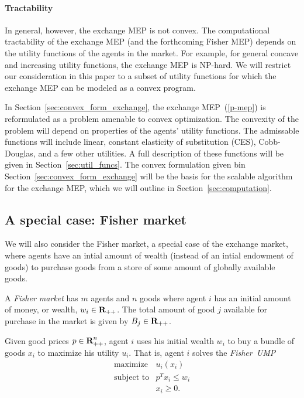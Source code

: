 \documentclass[12pt]{article}
\begin{document}
\paragraph{Tractability}
In general, however, the exchange MEP is not convex.
The computational tractability of the exchange MEP
(and the forthcoming Fisher MEP) depends on the utility functions of
the agents in the market.
For example, for general concave and increasing utility functions,
the exchange MEP is NP-hard. %
We will restrict our consideration in this paper to a subset of utility
functions for which the exchange MEP can be modeled as a convex program.

In Section~\ref{sec:convex_form_exchange}, the exchange MEP~(\ref{p-mep})
is reformulated as a problem amenable to convex optimization.
The convexity of the problem will depend on properties of the
agents' utility functions.
The admissable functions will include linear, constant elasticity
of substitution (CES), Cobb-Douglas, and a few other utilities.
A full description of these functions will be given in Section~\ref{sec:util_funcs}.
The convex formulation given bin Section~\ref{sec:convex_form_exchange} will
be the basis for the scalable algorithm for the exchange MEP, which
we will outline in Section~\ref{sec:computation}.



\subsection{A special case: Fisher market}

We will also consider the Fisher market, a special case of the exchange market, where agents have an intial amount of wealth (instead of an intial endowment of goods)
to purchase goods from a store of some amount of globally available goods.


A \emph{Fisher market} has $m$ agents and $n$ goods where
agent $i$ has an initial amount of money, or wealth, $w_i \in {\mbox{\bf R}}_{++}$.
The total amount of good $j$ available for purchase in the market is given by
$B_j \in {\mbox{\bf R}}_{++}$.

Given good prices $p \in {\mbox{\bf R}}^n_{++}$, agent $i$ uses his initial
wealth $w_i$ to buy a bundle of goods $x_i$ to maximize his utility $u_i$.
That is, agent $i$ solves the \emph{Fisher~UMP}
\begin{equation}
\label{p-fisher-ump}
\begin{array}{ll}
\mbox{maximize} & u_i(x_i) \\
\mbox{subject to} & p^T x_i \leq w_i \\
& x_i \geq 0.
\end{array}
\end{equation}
\end{document}
